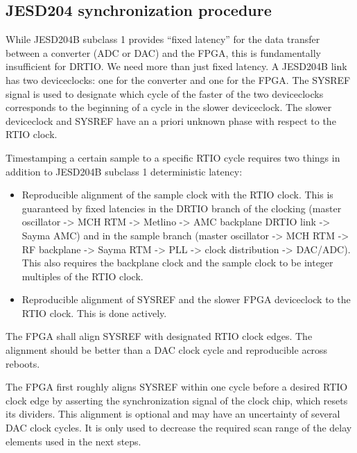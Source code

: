 \subsection{JESD204 synchronization
	procedure}\label{jesd204-synchronization-procedure}

While JESD204B subclass 1 provides ``fixed latency'' for the data
transfer between a converter (ADC or DAC) and the FPGA, this is
fundamentally insufficient for DRTIO. We need more than just fixed
latency. A JESD204B link has two deviceclocks: one for the converter and
one for the FPGA. The SYSREF signal is used to designate which cycle of
the faster of the two deviceclocks corresponds to the beginning of a
cycle in the slower deviceclock. The slower deviceclock and SYSREF have
an a priori unknown phase with respect to the RTIO clock.

Timestamping a certain sample to a specific RTIO cycle requires two
things in addition to JESD204B subclass 1 deterministic latency:

\begin{itemize}

	\item
	Reproducible alignment of the sample clock with the RTIO clock. This
	is guaranteed by fixed latencies in the DRTIO branch of the clocking
	(master oscillator -\textgreater{} MCH RTM -\textgreater{} Metlino
	-\textgreater{} AMC backplane DRTIO link -\textgreater{} Sayma AMC)
	and in the sample branch (master oscillator -\textgreater{} MCH RTM
	-\textgreater{} RF backplane -\textgreater{} Sayma RTM -\textgreater{}
	PLL -\textgreater{} clock distribution -\textgreater{} DAC/ADC). This
	also requires the backplane clock and the sample clock to be integer
	multiples of the RTIO clock.
	\item
	Reproducible alignment of SYSREF and the slower FPGA deviceclock to
	the RTIO clock. This is done actively.
\end{itemize}

The FPGA shall align SYSREF with designated RTIO clock edges. The
alignment should be better than a DAC clock cycle and reproducible
across reboots.

The FPGA first roughly aligns SYSREF within one cycle before a desired
RTIO clock edge by asserting the synchronization signal of the clock
chip, which resets its dividers. This alignment is optional and may have
an uncertainty of several DAC clock cycles. It is only used to decrease
the required scan range of the delay elements used in the next steps.

